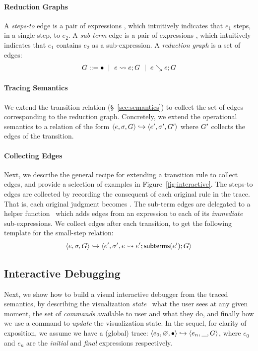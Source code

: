 \paragraph{Reduction Graphs}
%
A \emph{steps-to} edge is a pair of expressions , which
intuitively indicates that $e_1$ steps, in a single step, to $e_2$.
%
A \emph{sub-term} edge is a pair of expressions , which
intuitively indicates that $e_1$ contains $e_2$ as a sub-expression.
%
A \emph{reduction graph} is a set of edges:
$$G ::= \bullet \ \mid \  e \leadsto e; G \ \mid \  e \searrow e; G$$

\paragraph{Tracing Semantics}
%
We extend the transition relation (\S~\ref{sec:semantics}) to
collect the set of edges corresponding to the reduction graph.
%
Concretely, we extend the operational semantics to
a relation of the form $\langle e, \sigma, G \rangle \hookrightarrow \langle e', \sigma', G' \rangle$
where $G'$ collects the edges of the transition.

\paragraph{Collecting Edges}
%
Next, we describe the general recipe for extending a transition
rule to collect edges, and provide a selection of examples
in Figure~\ref{fig:interactive}.
%
The steps-to edges are collected by recording the consequent of
each original rule in the trace. That is, each original judgment
 becomes
.
%
The sub-term edges are delegated to a helper function \subtermssym\
which adds edges from an expression to each of its
\emph{immediate} sub-expressions.
%
We collect \subtermssym edges after each transition,
to get the following template for the small-step relation:
\[
\langle e, \sigma, G \rangle \hookrightarrow \langle e', \sigma', e \leadsto e'; \mathsf{subterms}(e'); G \rangle
\]


\subsection{Interactive Debugging}
\label{sec:traversing-graph}

Next, we show how to build a visual interactive debugger
from the traced semantics, by describing the visualization
\emph{state} \ie\ what the user sees at any given moment,
the set of \emph{commands} available to user and what
they do, and finally how we use a command to \emph{update}
the visualization state. In the sequel, for clarity of
exposition, we assume we have a (global) trace:
$\langle e_0, \varnothing, \bullet \rangle \hookrightarrow \langle e_n, \_, G \rangle$, where
$e_0$ and $e_n$ are the \emph{initial} and \emph{final}
expressions respectively.

